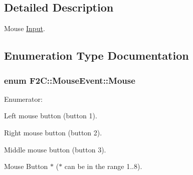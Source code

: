 \subsection{Detailed Description}
Mouse \hyperlink{class_f2_c_1_1_input}{Input}. 

\subsection{Enumeration Type Documentation}
\hypertarget{namespace_f2_c_1_1_mouse_event_ad51c859ddf42f97a3c31fb60c21821a8}{
\subsubsection[{Mouse}]{\setlength{\rightskip}{0pt plus 5cm}enum {\bf F2C::MouseEvent::Mouse}}}
\label{namespace_f2_c_1_1_mouse_event_ad51c859ddf42f97a3c31fb60c21821a8}
\begin{Desc}
\item[Enumerator: ]\par
\begin{description}
\item[{\em 
\hypertarget{namespace_f2_c_1_1_mouse_event_ad51c859ddf42f97a3c31fb60c21821a8a1808883a9ecc9dae87e1dd1c897b9686}{
Left}
\label{namespace_f2_c_1_1_mouse_event_ad51c859ddf42f97a3c31fb60c21821a8a1808883a9ecc9dae87e1dd1c897b9686}
}]Left mouse button (button 1). \item[{\em 
\hypertarget{namespace_f2_c_1_1_mouse_event_ad51c859ddf42f97a3c31fb60c21821a8af631815d2f2d0ff415970320fddaa856}{
Right}
\label{namespace_f2_c_1_1_mouse_event_ad51c859ddf42f97a3c31fb60c21821a8af631815d2f2d0ff415970320fddaa856}
}]Right mouse button (button 2). \item[{\em 
\hypertarget{namespace_f2_c_1_1_mouse_event_ad51c859ddf42f97a3c31fb60c21821a8acd570ee5d756fe60904cbda093fead5f}{
Middle}
\label{namespace_f2_c_1_1_mouse_event_ad51c859ddf42f97a3c31fb60c21821a8acd570ee5d756fe60904cbda093fead5f}
}]Middle mouse button (button 3). \item[{\em 
\hypertarget{namespace_f2_c_1_1_mouse_event_ad51c859ddf42f97a3c31fb60c21821a8a0976f4119272f5d4f6333cb5e7204b87}{
Button1}
\label{namespace_f2_c_1_1_mouse_event_ad51c859ddf42f97a3c31fb60c21821a8a0976f4119272f5d4f6333cb5e7204b87}
}]Mouse Button $\ast$ ($\ast$ can be in the range 1..8). \end{description}
\end{Desc}

